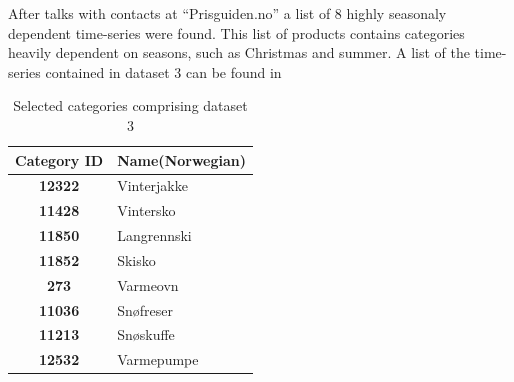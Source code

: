 After talks with contacts at ``Prisguiden.no'' a list of 8 highly seasonaly dependent time-series were found.
This list of products contains categories heavily dependent on seasons, such as Christmas and summer.
A list of the time-series contained in dataset 3 can be found in 


\begin{table}[H]
  \centering
  \caption{Selected categories comprising dataset 3}
  \label{table:dataset3}
  \begin{tabular}{|c|l|}\hline
    Category ID & Name(Norwegian)  \\ \hline
    \textbf{12322  } & Vinterjakke      \\ \hline
    \textbf{11428  } & Vintersko      \\ \hline
    \textbf{11850  } & Langrennski      \\ \hline
    \textbf{11852  } & Skisko     \\ \hline
    \textbf{273    } & Varmeovn     \\ \hline
    \textbf{11036  } & Snøfreser     \\ \hline
    \textbf{11213  } & Snøskuffe     \\ \hline
    \textbf{12532  } & Varmepumpe     \\ \hline
  \end{tabular}
\end{table}


